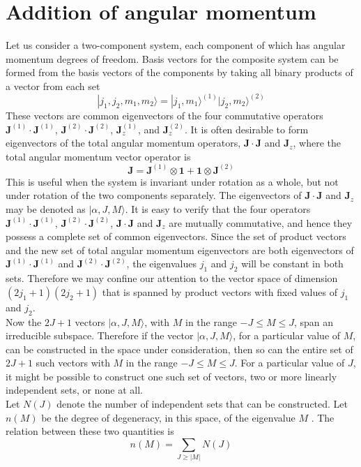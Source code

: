 \documentclass[cyan]{elegantnote}
\begin{document}
\section{Addition of angular momentum}
Let us consider a two-component system, each component of which has angular momentum degrees of freedom. Basis vectors for the composite system can be formed from the basis vectors of the components by taking all binary products of a vector from each set
\[|j_1,j_2,m_1,m_2\rangle = |j_1,m_1\rangle ^{(1)} |j_2,m_2\rangle ^{(2)}\]
These vectors are common eigenvectors of the four commutative operators $\bm{J}^{(1)}\cdot\bm{J}^{(1)}$, $\bm{J}^{(2)}\cdot\bm{J}^{(2)}$, $\bm{J}_z^{(1)}$, and $\bm{J}_z^{(2)}$.
It is often desirable to form eigenvectors of the total angular momentum operators, $\bm{J}\cdot\bm{J}$ and $\bm{J}_z$, where the total angular momentum vector operator is
\[\bm{J} = \bm{J}^{(1)}\otimes\bm{1} + \bm{1}\otimes\bm{J}^{(2)}\]
This is useful when the system is invariant under rotation as a whole, but not under rotation of the two components separately. 
The eigenvectors of $\bm{J}\cdot\bm{J}$ and $\bm{J}_z$ may be denoted as $|\alpha, J, M \rangle$. It is easy to verify that the four operators $\bm{J}^{(1)}\cdot\bm{J}^{(1)}$, $\bm{J}^{(2)}\cdot\bm{J}^{(2)}$, $\bm{J}\cdot\bm{J}$ and $\bm{J}_z$ are mutually commutative, and hence they possess a complete set of common eigenvectors. 
Since the set of product vectors and the new set of total angular momentum eigenvectors are both eigenvectors of $\bm{J}^{(1)}\cdot\bm{J}^{(1)}$ and $\bm{J}^{(2)}\cdot\bm{J}^{(2)}$, the eigenvalues $j_1$ and $j_2$ will be constant in both sets. Therefore
we may confine our attention to the vector space of dimension $(2j_1+1)(2j_2+1)$ that is spanned by product vectors with fixed values of $j_1$ and $j_2$.\\
Now the $2J+1$ vectors $|\alpha, J, M \rangle$, with $M$ in the range $-J \leq M \leq J$, span an irreducible subspace.
Therefore if the vector $|\alpha, J, M \rangle$, for a particular value of $M$, can be constructed in the space under consideration, then so can the entire set of $2J+1$
such vectors with $M$ in the range $-J \leq M \leq J$.
For a particular value of $J$, it might be possible to construct one such set of vectors, two or more linearly independent sets, or none at all. \\
Let $N(J)$ denote the number of independent sets that can be constructed. Let $n(M)$ be the degree of degeneracy, in this space, of the eigenvalue $M$ . The relation between these two quantities is
\[n(M) = \sum_{J \geq |M|} N(J)\]
\end{document}
